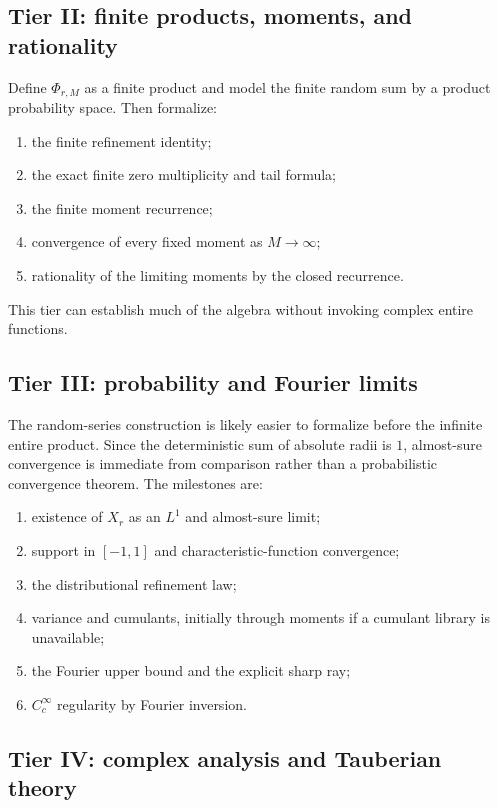 \documentclass[11pt,oneside]{article}
\theoremstyle{definition}
\theoremstyle{remark}
\begin{document}
\subsection{Tier II: finite products, moments, and rationality}

Define $\Phi_{r,M}$ as a finite product and model the finite random sum by a product probability space.  Then formalize:
\begin{enumerate}[label=\textbf{II.\arabic*}]
\item the finite refinement identity;
\item the exact finite zero multiplicity and tail formula;
\item the finite moment recurrence;
\item convergence of every fixed moment as $M\to\infty$;
\item rationality of the limiting moments by the closed recurrence.
\end{enumerate}
This tier can establish much of the algebra without invoking complex entire functions.

\subsection{Tier III: probability and Fourier limits}

The random-series construction is likely easier to formalize before the infinite entire product.  Since the deterministic sum of absolute radii is $1$, almost-sure convergence is immediate from comparison rather than a probabilistic convergence theorem.  The milestones are:
\begin{enumerate}[label=\textbf{III.\arabic*}]
\item existence of $X_r$ as an $L^1$ and almost-sure limit;
\item support in $[-1,1]$ and characteristic-function convergence;
\item the distributional refinement law;
\item variance and cumulants, initially through moments if a cumulant library is unavailable;
\item the Fourier upper bound and the explicit sharp ray;
\item $C_c^\infty$ regularity by Fourier inversion.
\end{enumerate}

\subsection{Tier IV: complex analysis and Tauberian theory}
\end{document}
